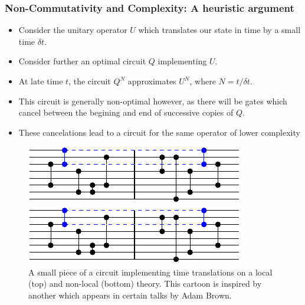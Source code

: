 \documentclass[8pt,aspectratio=169]{beamer}
\begin{document}
\begin{frame}
\frametitle{Non-Commutativity and Complexity: A heuristic argument}

\begin{minipage}[t]{0.5\linewidth}

\begin{itemize}

\item Consider the unitary operator $U$ which translates our state in time by a small time $\delta t$. 

\item Consider further an optimal circuit $Q$ implementing $U$.

\item At late time $t$, the circuit $Q^N$ approximates $U^N$, where $N= t/\delta t$.

\item This circuit is generally non-optimal however, as there will be gates which cancel between the begining and end of successive copies of $Q$.

\item These cancelations lead to a circuit for the same operator of lower complexity

\end{itemize}

\end{minipage}\hfill
%
\begin{minipage}[t]{0.48\linewidth}

\begin{figure}
    \begin{center}
    
        \includegraphics[scale=1]{animation/animation_3}    
        
        \vspace{2mm}
        
        \includegraphics[scale=1]{animation/animation_3}    
    
    \end{center}
    \caption{A small piece of a circuit implementing time translations on a local (top) and non-local (bottom) theory. This cartoon is inspired by another which appears in certain talks by Adam Brown.}
\end{figure}

\end{minipage}

\end{frame}
\end{document}
